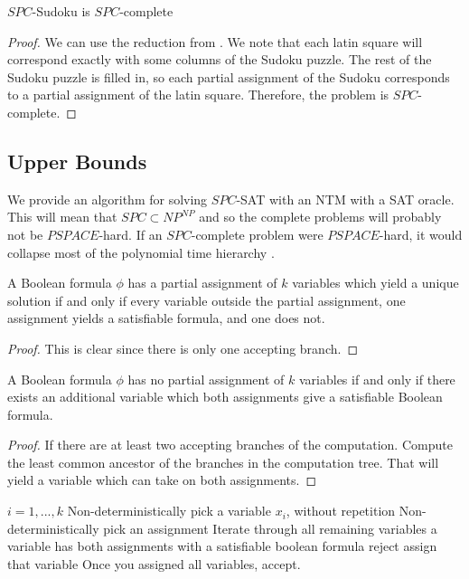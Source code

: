 \documentclass[runningheads,a4paper]{llncs}
\begin{document}
\begin{corollary}
$SPC$-Sudoku is $SPC$-complete
\end{corollary}

\begin{proof}
We can use the reduction from \cite{takayuki2003complexity}. We note that each latin square will correspond exactly with some columns of the Sudoku puzzle. The rest of the Sudoku puzzle is filled in, so each partial assignment of the Sudoku corresponds to a partial assignment of the latin square. Therefore, the problem is $SPC$-complete.
\end{proof}

\subsection{Upper Bounds}

We provide an algorithm for solving $SPC$-SAT with an NTM with a SAT oracle. This will mean that $SPC \subset NP^{NP}$ and so the complete problems will probably not be $PSPACE$-hard. If an $SPC$-complete problem were $PSPACE$-hard, it would collapse most of the polynomial time hierarchy \cite{stockmeyer1976polynomial}. 

\begin{lemma}
A Boolean formula $\phi$ has a partial assignment of $k$ variables which yield a unique solution if and only if every variable outside the partial assignment, one assignment yields a satisfiable formula, and one does not.
\end{lemma}

\begin{proof}
This is clear since there is only one accepting branch.
\end{proof}

\begin{lemma}
A Boolean formula $\phi$ has no partial assignment of $k$ variables if and only if there exists an additional variable which both assignments give a satisfiable Boolean formula.
\end{lemma}

\begin{proof}
If there are at least two accepting branches of the computation. Compute the least common ancestor of the branches in the computation tree. That will yield a variable which can take on both assignments. 
\end{proof}

\begin{codebox}
\li \For $i = 1, ..., k$ \Then
\li Non-deterministically pick a variable $x_i$, without repetition
\li Non-deterministically pick an assignment \End
\li Iterate through all remaining variables \Then
\li \If a variable has both assignments with a satisfiable boolean formula \Then
\li reject
\li \Else assign that variable \End \End
\li Once you assigned all variables, accept.
\end{codebox}
\end{document}
